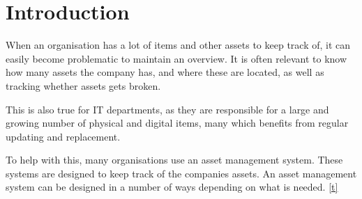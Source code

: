 \chapter{Introduction}\label{ch:introduction}
When an organisation has a lot of items and other assets to keep track of, it can easily become problematic to maintain an overview. It is often relevant to know how many assets the company has, and where these are located, as well as tracking whether assets gets broken.
\par
This is also true for IT departments, as they are responsible for a large and growing number of physical and digital items, many which benefits from regular updating and replacement. 
\par
To help with this, many organisations use an asset management system. These systems are designed to keep track of the companies assets. An asset management system can be designed in a number of ways depending on what is needed.
\ref{t}
